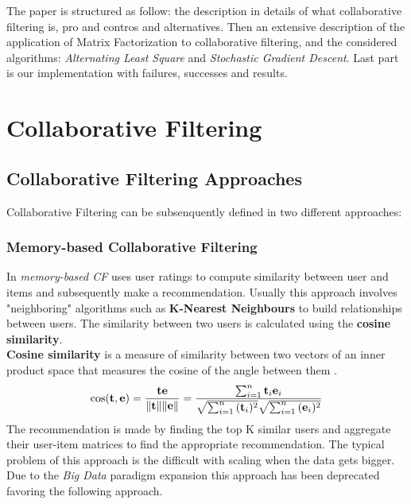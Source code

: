 \documentclass{sig-alternate-05-2015}
\begin{document}
The paper is structured as follow: the description in details of what
collaborative filtering is, pro and contros and alternatives. Then
an extensive description of the application of Matrix Factorization to
collaborative filtering, and the considered algorithms: \textit{Alternating Least Square}
and \textit{Stochastic Gradient Descent}. Last part is our implementation
with failures, successes and results.



\section{Collaborative Filtering}




\subsection{Collaborative Filtering Approaches}


Collaborative Filtering can be subsenquently defined in two
different approaches:

\subsubsection{Memory-based Collaborative Filtering}
In \textit{memory-based CF} uses user ratings to compute similarity
between user and items and subsequently make a recommendation. Usually
this approach involves "neighboring" algorithms such as \textbf{K-Nearest Neighbours}
to build relationships between users. The similarity between two users
is calculated using the \textbf{cosine similarity}.\\
\textbf{Cosine similarity} is a measure of similarity between two vectors of an inner product space that measures the cosine of the angle between them \cite{cosine-similarity}.
\begin{equation}
\cos ({\bf t},{\bf e})= {{\bf t} {\bf e} \over \|{\bf t}\| \|{\bf e}\|} = \frac{ \sum_{i=1}^{n}{{\bf t}_i{\bf e}_i} }{ \sqrt{\sum_{i=1}^{n}{({\bf t}_i)^2}} \sqrt{\sum_{i=1}^{n}{({\bf e}_i)^2}} }
\end{equation}
The recommendation is made by finding the top K similar users and aggregate their
user-item matrices to find the appropriate recommendation.
The typical problem of this approach is the difficult with scaling
when the data gets bigger. Due to the \textit{Big Data} paradigm expansion
this approach has been deprecated favoring the following approach.
\end{document}
